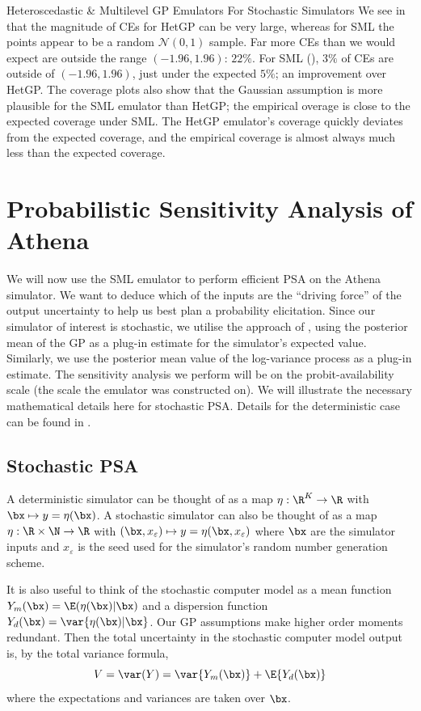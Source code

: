 \begin{chapter}{Heteroscedastic \& Multilevel GP Emulators For Stochastic Simulators\label{Ch:Hetsml}}
We see in  that the magnitude of CEs for HetGP can be very large, whereas for SML the points appear to be a random $\mathcal{N}(0,1)$ sample. Far more CEs than we would expect are outside the range $(-1.96,1.96)$: $22 \%$. For SML (), $3\%$ of CEs are outside of $(-1.96,1.96)$, just under the expected $5\%$; an improvement over HetGP. The coverage plots also show that the Gaussian assumption is more plausible for the SML emulator than HetGP; the empirical overage is close to the expected coverage under SML. The HetGP emulator's coverage quickly deviates from the expected coverage, and the empirical coverage is almost always much less than the expected coverage.

\section{Probabilistic Sensitivity Analysis of Athena}

We will now use the SML emulator to perform efficient PSA on the Athena simulator. We want to deduce which of the inputs are the ``driving force'' of the output uncertainty to help us best plan a probability elicitation. Since our simulator of interest is stochastic, we utilise the approach of \citet{Marrel2012}, using the posterior mean of the GP as a plug-in estimate for the simulator's expected value. Similarly, we use the posterior mean value of the log-variance process as a plug-in estimate. The sensitivity analysis we perform will be on the probit-availability scale (the scale the emulator was constructed on). We will illustrate the necessary mathematical details here for stochastic PSA. Details for the deterministic case can be found in \cite{Oakley04}.

\subsection{Stochastic PSA}

A deterministic simulator can be thought of as a map $\eta: \R^K \to \R$ with $\bx \mapsto y = \eta(\bx)$. A stochastic simulator can also be thought of as a map $\eta: \R \times \N \to \R$ with $(\bx, x_\varepsilon) \mapsto y = \eta(\bx, x_\varepsilon)$ where $\bx$ are the simulator inputs and $x_\varepsilon$ is the seed used for the simulator's random number generation scheme.

It is also useful to think of the stochastic computer model as a mean function $Y_m(\bx) = \E(\eta(\bx)|\bx)$ and a dispersion function $Y_d(\bx) = \var\{ \eta(\bx)| \bx \}$. Our GP assumptions make higher order moments redundant. Then the total uncertainty in the stochastic computer model output is, by the total variance formula,
\begin{equation*}
V = \var(Y) = \var\{Y_m(\bx) \} + \E\{ Y_d(\bx) \}
\end{equation*}
where the expectations and variances are taken over $\bx$.


\end{chapter}
